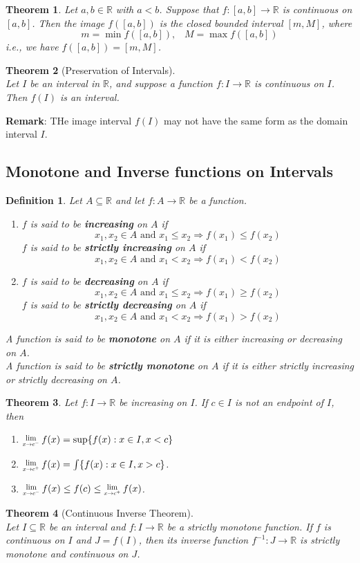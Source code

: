 \documentclass[12pt]{article}
\newcommand{\Lim}[1]{\raisebox{0.5ex}{\scalebox{0.8}{$\displaystyle \lim_{#1}\;$}}}
\newtheorem{definition}{Definition}[section]
\newtheorem{theorem}{Theorem}[section]
\theoremstyle{definition}
\begin{document}
\begin{theorem}\normalfont Let $a,b\in\mathbb{R}$ with $a<b$. Suppose that $f:[a,b]\to\mathbb{R}$ is continuous on $[a,b]$. Then the image $f([a,b])$ is the closed bounded interval $[m,M]$, where
\[
m=\min f([a,b]),\;\;\; M=\max f([a,b])
\]
i.e., we have $f([a,b])=[m,M]$.
\end{theorem}
\begin{theorem}[Preservation of Intervals]
\hfill\\\normalfont Let $I$ be an interval in $\mathbb{R}$, and suppose a function $f:I\to\mathbb{R}$ is continuous on $I$. Then $f(I)$ is an interval.
\end{theorem}
\textbf{Remark}: THe image interval $f(I)$ may not have the same form as the domain interval $I$.
\subsection{Monotone and Inverse functions on Intervals}
\begin{definition}\normalfont Let $A\subseteq\mathbb{R}$ and let $f:A\to\mathbb{R}$ be a function.
\begin{enumerate}
\item $f$ is said to be \textbf{increasing} on $A$ if
\[
x_1,x_2\in A\text{ and }x_1\leq x_2\Rightarrow f(x_1)\leq f(x_2)
\]
$f$ is said to be \textbf{strictly increasing} on $A$ if
\[
x_1,x_2\in A\text{ and }x_1< x_2\Rightarrow f(x_1)< f(x_2)
\]
\item $f$ is said to be \textbf{decreasing} on $A$ if
\[
x_1,x_2\in A\text{ and }x_1\leq x_2\Rightarrow f(x_1)\geq f(x_2)
\]
$f$ is said to be \textbf{strictly decreasing} on $A$ if
\[
x_1,x_2\in A\text{ and }x_1< x_2\Rightarrow f(x_1)> f(x_2)
\]
\end{enumerate}
\item A function is said to be \textbf{monotone} on $A$ if it is either increasing or decreasing on $A$.\\A function is said to be \textbf{strictly monotone} on $A$ if it is either strictly increasing or strictly decreasing on $A$.
\end{definition}
\begin{theorem}
\normalfont Let $f:I\to\mathbb{R}$ be increasing on $I$. If $c\in I$ is not an endpoint of $I$, then
\begin{enumerate}
\item $\Lim{x\to c^-}f(x)=\sup\{f(x):x\in I, x<c\}$
\item $\Lim{x\to c^+}f(x)=\int\{f(x):x\in I, x>c\}$.
\item $\Lim{x\to c^-}f(x)\leq f(c)\leq \Lim{x\to c^+}f(x)$.
\end{enumerate}
\end{theorem}
\begin{theorem}[Continuous Inverse Theorem]
\hfill\\\normalfont Let $I\subseteq \mathbb{R}$ be an interval and $f:I\to\mathbb{R}$ be a strictly monotone function. If $f$ is continuous on $I$ and $J=f(I)$, then its inverse function $f^{-1}:J\to \mathbb{R}$ is strictly monotone and continuous on $J$.
\end{theorem}
\end{document}
